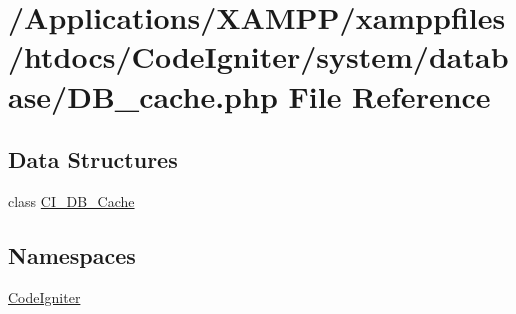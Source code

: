 \hypertarget{_d_b__cache_8php}{}\section{/\+Applications/\+X\+A\+M\+P\+P/xamppfiles/htdocs/\+Code\+Igniter/system/database/\+D\+B\+\_\+cache.php File Reference}
\label{_d_b__cache_8php}
\subsection*{Data Structures}
\begin{DoxyCompactItemize}
\item 
class \mbox{\hyperlink{class_c_i___d_b___cache}{C\+I\+\_\+\+D\+B\+\_\+\+Cache}}
\end{DoxyCompactItemize}
\subsection*{Namespaces}
\begin{DoxyCompactItemize}
\item 
 \mbox{\hyperlink{namespace_code_igniter}{Code\+Igniter}}
\end{DoxyCompactItemize}
